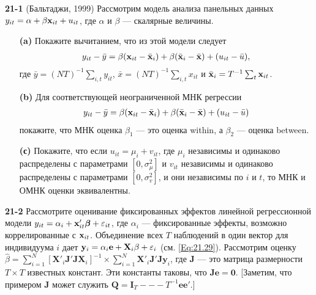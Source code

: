 \textbf{21-1} (Бальтаджи, 1999) Рассмотрим модель анализа панельных данных $y_{it}=\alpha + \beta \mathbf{x}_{it}+u_{it}$, где $\alpha$ и $\beta$ --- скалярные величины.
\begin{itemize}
\item[{\bf (a)}] Покажите вычитанием, что из этой модели следует
 \begin{align}
y_{it}-\bar{y}=\beta(\mathbf{x}_{it}-\bar{\mathbf{x}}_i) + \beta(\bar{\mathbf{x}}_{i}-\bar{\mathbf{x}}) + (u_{it}-\bar{u}),
\nonumber
\end{align}
где $\bar{y}=(NT)^{-1}\sum_{i,t} y_{it}$, $\bar{x}=(NT)^{-1}\sum_{i,t} x_{it}$ и $\bar{\mathbf{x}}_i=T^{-1}\sum_t\mathbf{x}_{it}$.

\item[{\bf (b)}] Для соответствующей неограниченной  МНК регрессии
\begin{align}
y_{it}-\bar{y}=\beta(\mathbf{x}_{it}-\bar{\mathbf{x}}_i) + \beta(\bar{\mathbf{x}}_{i}-\bar{\mathbf{x}}) + (u_{it}-\bar{u})
\nonumber
\end{align}
покажите, что МНК оценка $\beta_1$ --- это оценка within, а $\beta_2$ --- оценка between.

\item[{\bf (с)}] Покажите, что если $u_{it}=\mu_i+v_{it}$, где $\mu_i$ независимы и одинаково распределены с параметрами $[0,\sigma^2_\mu]$ и $v_{it}$ независимы и одинаково распределены с параметрами $[0,\sigma^2_v]$, и они независимы по  $i$ и $t$, то МНК и ОМНК оценки эквивалентны.
\end{itemize}

\textbf{21-2} Рассмотрите оценивание фиксированных эффектов линейной регрессионной модели $y_{it}=\alpha_i+\mathbf{x}'_{it}\bm\beta+\varepsilon_{it}$, где $\alpha_i$ --- фиксированные эффекты, возможно коррелированные с $\mathbf{x}_{it}$. Объединение всех  $T$ наблюдений в один вектор для индивидуума $i$ дает $\mathbf y_i=\alpha_i \mathbf e + \mathbf X_i \beta + \varepsilon_i$ (см. \ref{Eq:21.29}). Рассмотрим оценку $\hat{\beta}=\sum^N_{i=1}[ \mathbf X'_i \mathbf J' \mathbf J \mathbf X_i]^{-1} \times \sum^N_{i=1}\mathbf X'_i \mathbf J' \mathbf J \mathbf y_i$, где $\mathbf J$ --- это матрица размерности $T \times T$ известных констант. Эти константы таковы, что $\mathbf J \mathbf e =\mathbf 0$. [Заметим, что примером $\mathbf J$ может служить $\mathbf Q = \mathbf I_T --- T^{-1} \mathbf e \mathbf e'$.]

